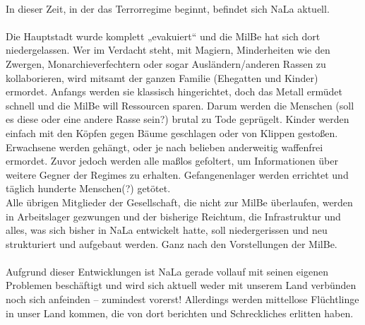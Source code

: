 \\
In dieser Zeit, in der das Terrorregime beginnt, befindet sich NaLa aktuell.\\
\\
Die Hauptstadt wurde komplett „evakuiert“ und die MilBe hat sich dort niedergelassen. Wer im Verdacht steht, mit Magiern, Minderheiten wie den Zwergen, Monarchieverfechtern oder sogar Ausländern/anderen Rassen zu kollaborieren, wird mitsamt der ganzen Familie (Ehegatten und Kinder) ermordet. Anfangs werden sie klassisch hingerichtet, doch das Metall ermüdet schnell und die MilBe will Ressourcen sparen. Darum werden die Menschen (soll es diese oder eine andere Rasse sein?) brutal zu Tode geprügelt. Kinder werden einfach mit den Köpfen gegen Bäume geschlagen oder von Klippen gestoßen. Erwachsene werden gehängt, oder je nach belieben anderweitig waffenfrei ermordet. Zuvor jedoch werden alle maßlos gefoltert, um Informationen über weitere Gegner der Regimes zu erhalten. Gefangenenlager werden errichtet und täglich hunderte Menschen(?) getötet.\\
Alle übrigen Mitglieder der Gesellschaft, die nicht zur MilBe überlaufen, werden in Arbeitslager gezwungen und der bisherige Reichtum, die Infrastruktur und alles, was sich bisher in NaLa entwickelt hatte, soll niedergerissen und neu strukturiert und aufgebaut werden. Ganz nach den Vorstellungen der MilBe.\\
\\
Aufgrund dieser Entwicklungen ist NaLa gerade vollauf mit seinen eigenen Problemen beschäftigt und wird sich aktuell weder mit unserem Land verbünden noch sich anfeinden – zumindest vorerst! Allerdings werden mittellose Flüchtlinge in unser Land kommen, die von dort berichten und Schreckliches erlitten haben.
